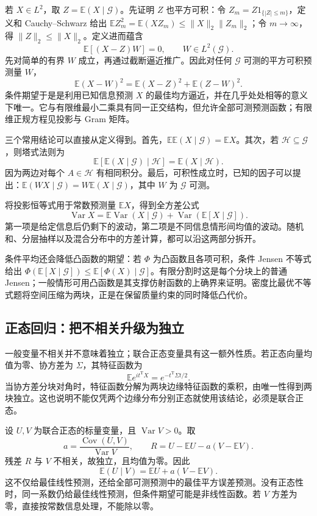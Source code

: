 \documentclass[UTF8,12pt,a4paper,fontset=fandol]{ctexbook}
\begin{document}
若 $X\in L^2$，取 $Z=\mathbb E(X\mid\mathcal G)$。先证明 $Z$ 也平方可积：令 $Z_m=Z1_{\{|Z|\le m\}}$，定义和 Cauchy--Schwarz 给出 $\mathbb EZ_m^2=\mathbb E(XZ_m)\le\|X\|_2\|Z_m\|_2$；令 $m\to\infty$，得 $\|Z\|_2\le\|X\|_2$。定义进而蕴含
\[
\mathbb E[(X-Z)W]=0,\qquad W\in L^2(\mathcal G).
\]
先对简单的有界 $W$ 成立，再通过截断逼近推广。因此对任何 $\mathcal G$ 可测的平方可积预测量 $W$，
\[
\mathbb E(X-W)^2=\mathbb E(X-Z)^2+\mathbb E(Z-W)^2.
\]
条件期望于是是利用已知信息预测 $X$ 的最佳均方逼近，并在几乎处处相等的意义下唯一。它与有限维最小二乘具有同一正交结构，但允许全部可测预测函数；有限维正规方程见投影与 Gram 矩阵。

三个常用结论可以直接从定义得到。首先，$\mathbb E\mathbb E(X\mid\mathcal G)=\mathbb EX$。其次，若 $\mathcal H\subseteq\mathcal G$，则塔式法则为
\[
\mathbb E[\mathbb E(X\mid\mathcal G)\mid\mathcal H]
=\mathbb E(X\mid\mathcal H).
\]
因为两边对每个 $A\in\mathcal H$ 有相同积分。最后，可积性成立时，已知的因子可以提出：$\mathbb E(WX\mid\mathcal G)=W\mathbb E(X\mid\mathcal G)$，其中 $W$ 为 $\mathcal G$ 可测。

将投影恒等式用于常数预测量 $\mathbb EX$，得到全方差公式
\[
\operatorname{Var}X
=\mathbb E\operatorname{Var}(X\mid\mathcal G)
+\operatorname{Var}(\mathbb E[X\mid\mathcal G]).
\]
第一项是给定信息后仍剩下的波动，第二项是不同信息情形间均值的波动。随机和、分层抽样以及混合分布中的方差计算，都可以沿这两部分拆开。

条件平均还会降低凸函数的期望：若 $\Phi$ 为凸函数且各项可积，条件 Jensen 不等式给出 $\Phi(\mathbb E[X\mid\mathcal G])\le\mathbb E[\Phi(X)\mid\mathcal G]$。有限分割时这是每个分块上的普通 Jensen；一般情形可用凸函数是其支撑仿射函数的上确界来证明。密度比最优不等式题将空间压缩为两块，正是在保留质量约束的同时降低凸代价。

\subsection{正态回归：把不相关升级为独立}

\label{app:probability-gaussian}

一般变量不相关并不意味着独立；联合正态变量具有这一额外性质。若正态向量均值为零、协方差为 $\Sigma$，其特征函数为
\[
\mathbb Ee^{it^{\mathrm T}X}=e^{-t^{\mathrm T}\Sigma t/2}.
\]
当协方差分块对角时，特征函数分解为两块边缘特征函数的乘积，由唯一性得到两块独立。这也说明不能仅凭两个边缘分布分别正态就使用该结论，必须是联合正态。

设 $U,V$ 为联合正态的标量变量，且 $\operatorname{Var}V>0$。取
\[
a=\frac{\operatorname{Cov}(U,V)}{\operatorname{Var}V},\qquad
R=U-\mathbb EU-a(V-\mathbb EV).
\]
残差 $R$ 与 $V$ 不相关，故独立，且均值为零。因此
\[
\mathbb E(U\mid V)=\mathbb EU+a(V-\mathbb EV).
\]
这不仅给最佳线性预测，还给全部可测预测中的最佳平方误差预测。没有正态性时，同一系数仍给最佳线性预测，但条件期望可能是非线性函数。若 $V$ 方差为零，直接按常数信息处理，不能除以零。
\end{document}
